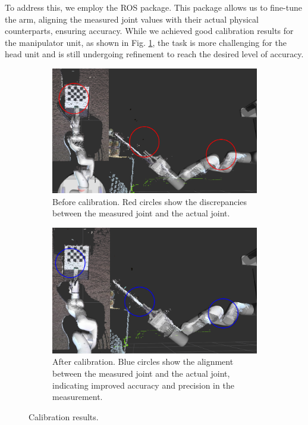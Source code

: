 \documentclass[runningheads,a4paper]{llncs}
\begin{document}
To address this, we employ the \cite{ferguson2015robust} ROS package.
This package allows us to fine-tune the arm, aligning the measured joint values with their actual physical counterparts, ensuring accuracy.
While we achieved good calibration results for the manipulator unit, as shown in Fig. \ref{fig:calibration}, the task is more challenging for the head unit and is still undergoing refinement to reach the desired level of accuracy.

\begin{figure}[tbp]
	\centering
	\begin{subfigure}[t]{0.49\linewidth}
		\includegraphics[width=\linewidth]{images/calibration_before.png}
		\caption{Before calibration. Red circles show the discrepancies between the measured joint and the actual joint.}
	\end{subfigure}
	\hfill
	\begin{subfigure}[t]{0.49\linewidth}
		\includegraphics[width=\linewidth]{images/calibration_after.png}
		\caption{After calibration. Blue circles show the alignment between the measured joint and the actual joint, indicating improved accuracy and precision in the measurement.}
	\end{subfigure}
	\caption{Calibration results.}
	\label{fig:calibration}
\end{figure}
\end{document}
